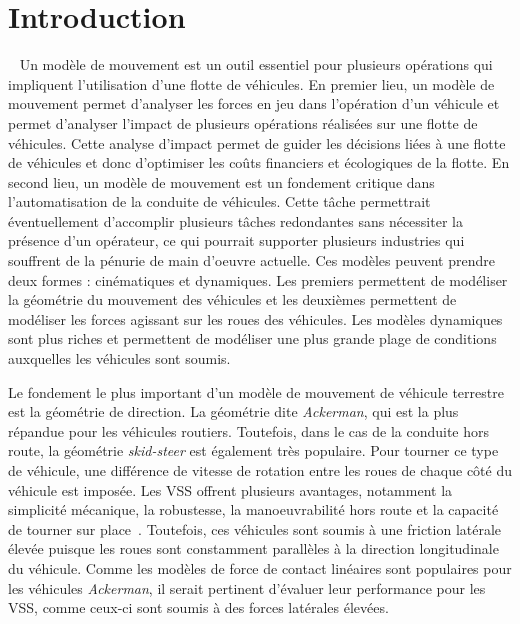 \section{Introduction}~\label{sec:intro}
Un modèle de mouvement est un outil essentiel pour plusieurs opérations qui impliquent l'utilisation d'une flotte de véhicules.
En premier lieu, un modèle de mouvement permet d'analyser les forces en jeu dans l'opération d'un véhicule et permet d'analyser l'impact de plusieurs opérations réalisées sur une flotte de véhicules.
Cette analyse d'impact permet de guider les décisions liées à une flotte de véhicules et donc d'optimiser les coûts financiers et écologiques de la flotte.
En second lieu, un modèle de mouvement est un fondement critique dans l'automatisation de la conduite de véhicules. 
Cette tâche permettrait éventuellement d'accomplir plusieurs tâches redondantes sans nécessiter la présence d'un opérateur, ce qui pourrait supporter plusieurs industries qui souffrent de la pénurie de main d'oeuvre actuelle.
Ces modèles peuvent prendre deux formes : cinématiques et dynamiques.
Les premiers permettent de modéliser la géométrie du mouvement des véhicules et les deuxièmes permettent de modéliser les forces agissant sur les roues des véhicules.
Les modèles dynamiques sont plus riches et permettent de modéliser une plus grande plage de conditions auxquelles les véhicules sont soumis. 

Le fondement le plus important d'un modèle de mouvement de véhicule terrestre est la géométrie de direction. 
La géométrie dite \textit{Ackerman}, qui est la plus répandue pour les véhicules routiers.
Toutefois, dans le cas de la conduite hors route, la géométrie \textit{skid-steer} est également très populaire.
Pour tourner ce type de véhicule, une différence de vitesse de rotation entre les roues de chaque côté du véhicule est imposée. 
Les \ac{VSS} offrent plusieurs avantages, notamment la simplicité mécanique, la robustesse, la manoeuvrabilité hors route et la capacité de tourner sur place~\citep{Shamah2001}.
Toutefois, ces véhicules sont soumis à une friction latérale élevée puisque les roues sont constamment parallèles à la direction longitudinale du véhicule. 
Comme les modèles de force de contact linéaires sont populaires pour les véhicules \textit{Ackerman}, il serait pertinent d'évaluer leur performance pour les \ac{VSS}, comme ceux-ci sont soumis à des forces latérales élevées.

